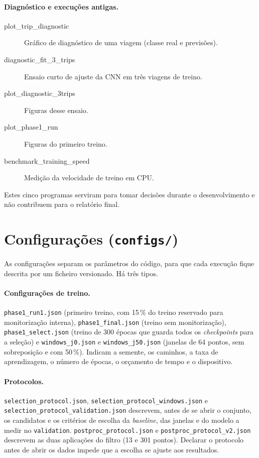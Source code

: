 \documentclass[11pt,a4paper]{article}
\newcommand{\f}[1]{\texttt{#1}}
\begin{document}
\paragraph{Diagnóstico e execuções antigas.}
\begin{description}
\item[plot\_trip\_diagnostic] Gráfico de diagnóstico de uma viagem (classe real e previsões).
\item[diagnostic\_fit\_3\_trips] Ensaio curto de ajuste da CNN em três viagens de treino.
\item[plot\_diagnostic\_3trips] Figuras desse ensaio.
\item[plot\_phase1\_run] Figuras do primeiro treino.
\item[benchmark\_training\_speed] Medição da velocidade de treino em CPU.
\end{description}
\noindent Estes cinco programas serviram para tomar decisões durante o desenvolvimento e não
contribuem para o relatório final.

\section{Configurações (\f{configs/})}\label{sec:configs}

As configurações separam os parâmetros do código, para que cada execução fique descrita por um
ficheiro versionado. Há três tipos.

\paragraph{Configurações de treino.} \f{phase1\_run1.json} (primeiro treino, com 15\,\% do treino
reservado para monitorização interna), \f{phase1\_final.json} (treino sem monitorização),
\f{phase1\_select.json} (treino de 300 épocas que guarda todos os \emph{checkpoints} para a
seleção) e \f{windows\_j0.json} e \f{windows\_j50.json} (janelas de 64 pontos, sem sobreposição e
com 50\,\%). Indicam a semente, os caminhos, a taxa de aprendizagem, o número de épocas, o
orçamento de tempo e o dispositivo.

\paragraph{Protocolos.} \f{selection\_protocol.json}, \f{selection\_protocol\_windows.json} e
\f{selection\_protocol\_validation.json} descrevem, antes de se abrir o conjunto, os candidatos e
os critérios de escolha da \emph{baseline}, das janelas e do modelo a medir no \f{validation}.
\f{postproc\_protocol.json} e \f{postproc\_protocol\_v2.json} descrevem as duas aplicações do
filtro (13 e 301 pontos). Declarar o protocolo antes de abrir os dados impede que a escolha se
ajuste aos resultados.
\end{document}
